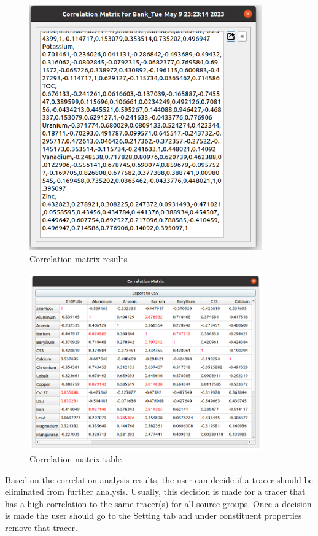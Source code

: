 \documentclass[12pt]{report}
\begin{document}
\begin{figure}[ht]
    \centering
    \includegraphics[width=10cm]{Figures/Correlation_Matrix.png}
    \caption{Correlation matrix results}
    \label{fig:correlation_matrix}
\end{figure}


\begin{figure}[ht]
    \centering
    \includegraphics[width=10cm]{Figures/Correlation_Table.png}
    \caption{Correlation matrix table}
    \label{fig:correlation_table}
\end{figure}

\FloatBarrier

Based on the correlation analysis results, the user can decide if a tracer should be eliminated from further analysis. Usually, this decision is made for a tracer that has a high correlation to the same tracer(s) for all source groups. Once a decision is made the user should go to the Setting tab and under constituent properties remove that tracer.
\end{document}
